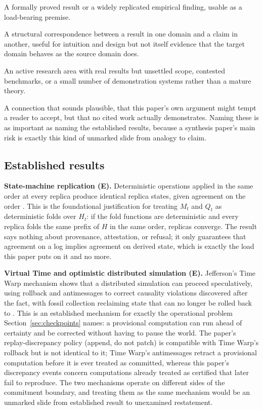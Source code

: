 \documentclass[11pt]{article}
\begin{document}
\begin{description}[leftmargin=1.6cm, style=nextline]
\item[\textbf{Established (E).}] A formally proved result or a widely replicated empirical finding, usable as a load-bearing premise.
\item[\textbf{Analogy (A).}] A structural correspondence between a result in one domain and a claim in another, useful for intuition and design but not itself evidence that the target domain behaves as the source domain does.
\item[\textbf{Emerging (M).}] An active research area with real results but unsettled scope, contested benchmarks, or a small number of demonstration systems rather than a mature theory.
\item[\textbf{Unsupported (U).}] A connection that sounds plausible, that this paper's own argument might tempt a reader to accept, but that no cited work actually demonstrates. Naming these is as important as naming the established results, because a synthesis paper's main risk is exactly this kind of unmarked slide from analogy to claim.
\end{description}

\subsection{Established results}
\label{sec:established}

\textbf{State-machine replication (E).} Deterministic operations applied in the same order at every replica produce identical replica states, given agreement on the order \cite{schneider1990}. This is the foundational justification for treating $M_t$ and $Q_t$ as deterministic folds over $H_t$: if the fold functions are deterministic and every replica folds the same prefix of $H$ in the same order, replicas converge. The result says nothing about provenance, attestation, or refusal; it only guarantees that agreement on a log implies agreement on derived state, which is exactly the load this paper puts on it and no more.

\textbf{Virtual Time and optimistic distributed simulation (E).} Jefferson's Time Warp mechanism shows that a distributed simulation can proceed speculatively, using rollback and antimessages to correct causality violations discovered after the fact, with fossil collection reclaiming state that can no longer be rolled back to \cite{jefferson1985}. This is an established mechanism for exactly the operational problem Section~\ref{sec:checkpoints} names: a provisional computation can run ahead of certainty and be corrected without having to pause the world. The paper's replay-discrepancy policy (append, do not patch) is compatible with Time Warp's rollback but is not identical to it; Time Warp's antimessages retract a provisional computation before it is ever treated as committed, whereas this paper's discrepancy events concern computations already treated as certified that later fail to reproduce. The two mechanisms operate on different sides of the commitment boundary, and treating them as the same mechanism would be an unmarked slide from established result to unexamined restatement.
\end{document}
